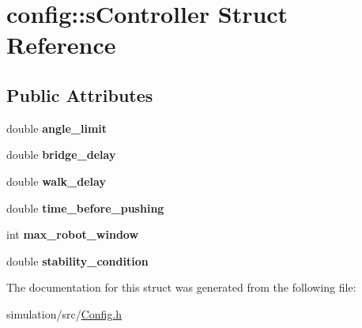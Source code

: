 \hypertarget{structconfig_1_1s_controller}{}\section{config\+:\+:s\+Controller Struct Reference}
\label{structconfig_1_1s_controller}
\subsection*{Public Attributes}
\begin{DoxyCompactItemize}
\item 
\mbox{\label{structconfig_1_1s_controller_a8923acd9bfb67b8e9e3c1c3c8dbec683}} 
double {\bfseries angle\+\_\+limit}
\item 
\mbox{\label{structconfig_1_1s_controller_a2fde08fbf75929ab52e5e23cee7cc221}} 
double {\bfseries bridge\+\_\+delay}
\item 
\mbox{\label{structconfig_1_1s_controller_ae6375847a7a00925fb89b9410b37ce1f}} 
double {\bfseries walk\+\_\+delay}
\item 
\mbox{\label{structconfig_1_1s_controller_af54d74a54e118e607b93f0cda27d4898}} 
double {\bfseries time\+\_\+before\+\_\+pushing}
\item 
\mbox{\label{structconfig_1_1s_controller_a945185f0421baea5a8d447e75ec78b38}} 
int {\bfseries max\+\_\+robot\+\_\+window}
\item 
\mbox{\label{structconfig_1_1s_controller_ad6caeeebb6d554e790a62a3d6939d853}} 
double {\bfseries stability\+\_\+condition}
\end{DoxyCompactItemize}


The documentation for this struct was generated from the following file\+:\begin{DoxyCompactItemize}
\item 
simulation/src/\mbox{\hyperlink{_config_8h}{Config.\+h}}\end{DoxyCompactItemize}
